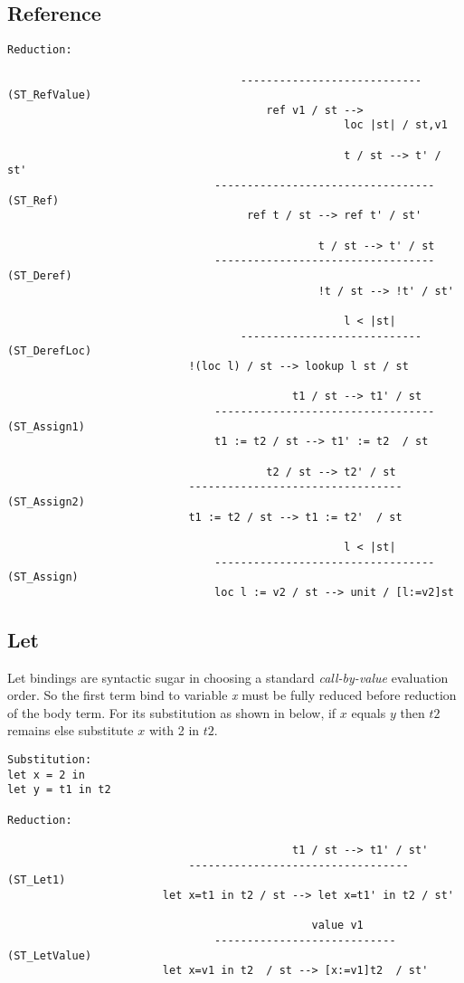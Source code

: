 \subsection{Reference}
\begin{lstlisting}
Reduction:

									----------------------------   (ST_RefValue)
										ref v1 / st --> 
													loc |st| / st,v1

													t / st --> t' / st'
								----------------------------------  (ST_Ref)
								     ref t / st --> ref t' / st'
								
												t / st --> t' / st
								----------------------------------  (ST_Deref)
												!t / st --> !t' / st'
								
													l < |st|
									----------------------------   (ST_DerefLoc)
							!(loc l) / st --> lookup l st / st
								
											t1 / st --> t1' / st
								----------------------------------  (ST_Assign1)
								t1 := t2 / st --> t1' := t2  / st
								
										t2 / st --> t2' / st
							---------------------------------   (ST_Assign2)
							t1 := t2 / st --> t1 := t2'  / st
								
													l < |st|
								----------------------------------  (ST_Assign)
								loc l := v2 / st --> unit / [l:=v2]st

\end{lstlisting}

\subsection{Let}
Let bindings are syntactic sugar in choosing a standard \textit{call-by-value} evaluation order. So the first term bind to variable \textit{x} must be fully reduced before reduction of the body term. For its substitution as shown in below,  if $x$ equals $y$ then $t2$ remains else substitute $x$ with 2 in $t2$.
\begin{lstlisting}
Substitution: 
let x = 2 in
let y = t1 in t2

Reduction:

											t1 / st --> t1' / st'
							----------------------------------  (ST_Let1)
						let x=t1 in t2 / st --> let x=t1' in t2 / st'
						
											   value v1
								----------------------------   (ST_LetValue)
						let x=v1 in t2  / st --> [x:=v1]t2  / st'
\end{lstlisting}

